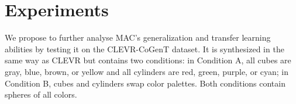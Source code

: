 \section{Experiments}

We propose to further analyse MAC’s generalization and transfer learning abilities by testing it on the CLEVR-CoGenT dataset. It is synthesized in the same way as CLEVR but contains two conditions: in Condition A, all cubes are gray, blue, brown, or yellow and all cylinders are red, green, purple, or cyan; in Condition B, cubes and cylinders swap color palettes. Both conditions contain spheres of all colors. 
